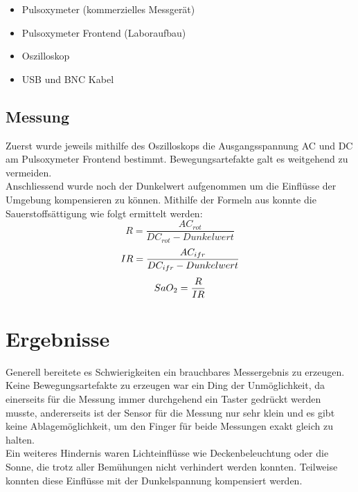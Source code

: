 \documentclass[11pt]{scrartcl}
\begin{document}
    \begin{itemize}
        \item  Pulsoxymeter (kommerzielles Messgerät)
        \item Pulsoxymeter Frontend (Laboraufbau)
        \item Oszilloskop
        \item USB und BNC Kabel 
        
    \end{itemize}

    \subsection{Messung}
    Zuerst wurde jeweils mithilfe des Oszilloskops die Ausgangsspannung AC und DC am Pulsoxymeter Frontend bestimmt.
    Bewegungsartefakte galt es weitgehend zu vermeiden.\\
    Anschliessend wurde noch der Dunkelwert aufgenommen um die Einflüsse der Umgebung kompensieren zu können.
    Mithilfe der Formeln aus \cite{Pulsoxymetrie} konnte die Sauerstoffsättigung wie folgt ermittelt werden:
    \begin{equation}
        R = \frac{AC_{rot}}{DC_{rot} - Dunkelwert} 
    \end{equation}
    \begin{equation}
        IR = \frac{AC_{ifr}}{DC_{ifr} - Dunkelwert} \\
    \end{equation}
    \begin{equation}
        SaO_{2} = \frac{R}{IR} \\
    \end{equation}

    \section{Ergebnisse}
    Generell bereitete es Schwierigkeiten ein brauchbares Messergebnis zu erzeugen.
    Keine Bewegungsartefakte zu erzeugen war ein Ding der Unmöglichkeit, da einerseits für die Messung immer
    durchgehend ein Taster gedrückt werden musste, andererseits ist der Sensor für die Messung nur sehr klein und es
    gibt keine Ablagemöglichkeit, um den Finger für beide Messungen exakt gleich zu halten.\\
    Ein weiteres Hindernis waren Lichteinflüsse wie Deckenbeleuchtung oder die Sonne, die trotz aller
    Bemühungen nicht verhindert werden konnten.
    Teilweise konnten diese Einflüsse mit der Dunkelspannung kompensiert werden.
\end{document}
